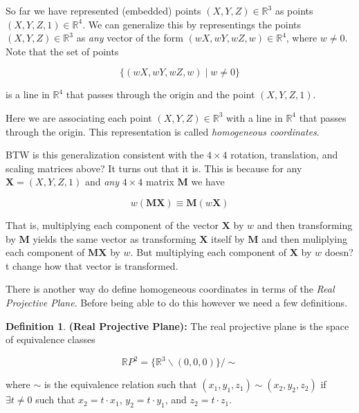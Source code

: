 \documentclass{article}
\theoremstyle{definition}
\newtheorem{definition}{Definition}[section]
\begin{document}
\bigskip
\noindent
So far we have represented (embedded) points $(X, Y, Z) \in \mathbb{R}^3$ as points $(X, Y, Z, 1) \in \mathbb{R}^4$. We can generalize this by representings
the points $(X, Y, Z) \in \mathbb{R}^3$ as \emph{any} vector of the form $(wX, wY, wZ, w) \in \mathbb{R}^4$, where $w \neq 0$. Note that the set of points

\bigskip
\begin{equation*}
\big \{(wX,wY,wZ,w) \mid w \neq 0\big \}
\end{equation*}

\bigskip
\noindent
is a line in $\mathbb{R}^4$  that passes through the origin and the point $(X,Y,Z,1)$. 

\bigskip
\noindent
Here we are associating each point  $(X,Y,Z) \in \mathbb{R}^3$ with a line in $\mathbb{R}^4$ that passes through the origin. 
This representation is called \emph{homogeneous coordinates}.

\bigskip
\noindent
BTW is this generalization consistent with the $4 \times 4$ rotation, translation, and scaling matrices above? It turns out that it is. This is because
for any $\mathbf{X} = (X, Y, Z, 1)$ and \emph{any} $4 \times 4$ matrix $\mathbf{M}$ we have

\begin{equation*}
w(\mathbf{MX}) \equiv \mathbf{M}(w\mathbf{X})
\end{equation*}

\bigskip
\noindent
That is, multiplying each component of the vector $\mathbf{X}$ by $w$ and then transforming by $\mathbf{M}$ yields the same vector as transforming 
$\mathbf{X}$ itself by $\mathbf{M}$ and then muliplying each component of $\mathbf{MX}$ by $w$. But multiplying each component of $\mathbf{X}$
by $w$ doesn?t change how that vector is transformed.

\bigskip
\noindent
There is another way do define homogeneous coordinates in terms of the \emph{Real Projective Plane}. Before being able to do this however we need 
a few definitions.

\begin{definition} {\bf (Real Projective Plane):}
The real projective plane is the space of equivalence classes

\begin{equation*}
\mathbb{R}P^2 =  \{\mathbb{R}^3 \backslash (0,0,0) \} / \sim
\label{eqn:rpp}
\end{equation*}

\bigskip
\noindent
where $\sim$ is the equivalence relation such that $(x_1,y_1,z_1) \sim (x_2,y_2,z_2)$
if $\exists t \neq 0$ such that $x_2 = t \cdot x_1$, $y_2 = t \cdot y_1$, and $z_2 = t \cdot z_1$.
\end{definition}
\end{document}
